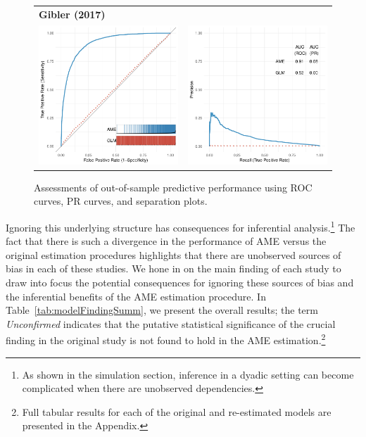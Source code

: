 \begin{figure}
\begin{tabular}{cc}
		\multicolumn{2}{l}{\textbf{\tiny{Gibler (2017)}}} \\
		\includegraphics[width=.4\textwidth]{graphics/gibler_roc_outSample.pdf} & 
		\includegraphics[width=.4\textwidth]{graphics/gibler_pr_outSample.pdf} \\
	\end{tabular}
	\caption{Assessments of out-of-sample predictive performance using ROC curves, PR curves, and separation plots.}
	\label{fig:perf}	
\end{figure}

Ignoring this underlying structure has consequences for inferential analysis.\footnote{As shown in the simulation section, inference in a dyadic setting can become complicated when there are unobserved dependencies.} The fact that there is such a divergence in the performance of AME versus the original estimation procedures highlights that there are unobserved sources of bias in each of these studies. We hone in on the main finding of each study to draw into focus the potential consequences for ignoring these sources of bias and the inferential benefits of the AME estimation procedure.  In Table~\ref{tab:modelFindingSumm}, we present the overall results; the term \textit{Unconfirmed} indicates that the putative statistical significance of the crucial finding in the original study is not found to hold in the AME estimation.\footnote{Full tabular results for each of the original and re-estimated models are presented in the Appendix.}

